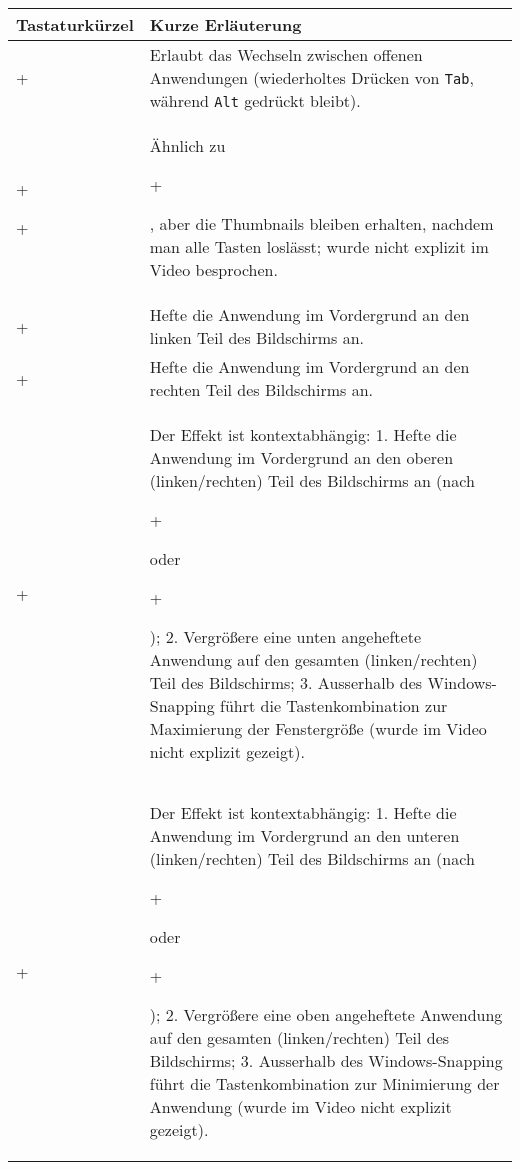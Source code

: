 \documentclass[11pt,a4paper]{scrartcl}
\newcommand*\keystroke[1]{%
  \begin{tikzpicture}[baseline=(key.base), very thin, line cap=round, black, rounded corners=0pt]%
    \node [draw, fill=white, fill opacity=1, rectangle, rounded corners=2pt, inner sep=1pt, minimum width=1.2em, font=\scriptsize\sffamily] (key) {#1\strut};

    \begin{scope}[on background layer]
      \draw [rounded corners=1pt, fill=white] ($ (key.north west) + (-2pt, 2pt) $) rectangle ($ (key.south east) + (2pt, -2pt) $);

      \fill [gray!60] ($ (key.south west) + (2pt, 0.1pt) $) -- ($ (key.south west) + (-1pt, -2pt) $)
                  -- ($ (key.south east) + (1pt, -2pt) $)  -- ($ (key.south east) + (-2pt, 0.1pt) $) -- cycle;

      \fill [gray!60] ($ (key.south east) + (-0.1pt, 2pt) $) -- ($ (key.south east) + (2pt, -1pt) $)
                  -- ($ (key.north east) + (2pt, 1pt) $)    -- ($ (key.north east) + (-0.1pt, -2pt) $) -- cycle;
    \end{scope}

    \draw ($ (key.north west) + (0.1pt, -2pt) $) -- ($ (key.north west) + (-2pt, 1pt) $);
    \draw ($ (key.north west) + (2pt, -0.1pt) $) -- ($ (key.north west) + (-1pt, 2pt) $);

    \draw ($ (key.north east) + (-0.1pt, -2pt) $) -- ($ (key.north east) + (2pt, 1pt) $);
    \draw ($ (key.north east) + (-2pt, -0.1pt) $) -- ($ (key.north east) + (1pt, 2pt) $);

    \draw ($ (key.south west) + (0.1pt, 2pt) $) -- ($ (key.south west) + (-2pt, -1pt) $);
    \draw ($ (key.south west) + (2pt, 0.1pt) $) -- ($ (key.south west) + (-1pt, -2pt) $);

    \draw ($ (key.south east) + (-0.1pt, 2pt) $) -- ($ (key.south east) + (2pt, -1pt) $);
    \draw ($ (key.south east) + (-2pt, 0.1pt) $) -- ($ (key.south east) + (1pt, -2pt) $);
  \end{tikzpicture}%
}
\newcommand{\WindowsLogo}{\raisebox{-0.1em}{%
  \texttt{[image: Windows\_3\_logo\_simplified]}}}
\begin{document}
\begin{center}
  \begin{tabularx}{0.9\textwidth}{lX}
  \toprule
  Tastaturkürzel & Kurze Erläuterung \\
  \midrule
  \keystroke{Alt}+\keystroke{Tab} & Erlaubt das Wechseln zwischen offenen   Anwendungen (wiederholtes Drücken von \texttt{Tab}, während \texttt{Alt} gedrückt bleibt).\\
  \keystroke{Ctrl}+\keystroke{Alt}+\keystroke{Tab} & Ähnlich zu
  \keystroke{Alt}+\keystroke{Tab}, aber die Thumbnails bleiben erhalten,
  nachdem man alle Tasten loslässt; wurde nicht explizit im Video besprochen. \\
  \midrule 
  \keystroke{\WindowsLogo}+\keystroke{$\leftarrow$} & Hefte die Anwendung im Vordergrund an den linken Teil des Bildschirms an. \\
  \keystroke{\WindowsLogo}+\keystroke{$\rightarrow$} & Hefte die Anwendung im Vordergrund an den rechten Teil des Bildschirms an. \\
  \midrule
  \keystroke{\WindowsLogo}+\keystroke{$\uparrow$} & Der Effekt ist
  kontextabhängig: 1. Hefte die Anwendung im Vordergrund an den oberen
  (linken/rechten) Teil des Bildschirms an (nach
  \keystroke{\WindowsLogo}+\keystroke{$\leftarrow$} oder
  \keystroke{\WindowsLogo}+\keystroke{$\rightarrow$}); 2. Vergrößere
  eine unten angeheftete Anwendung auf den gesamten (linken/rechten)
  Teil des Bildschirms; 3. Ausserhalb des Windows-Snapping führt die
  Tastenkombination zur Maximierung der Fenstergröße (wurde im Video
  nicht explizit gezeigt). \\
  \keystroke{\WindowsLogo}+\keystroke{$\downarrow$} & Der Effekt ist
  kontextabhängig: 1. Hefte die Anwendung im Vordergrund an den unteren
  (linken/rechten) Teil des Bildschirms an (nach
  \keystroke{\WindowsLogo}+\keystroke{$\leftarrow$} oder
  \keystroke{\WindowsLogo}+\keystroke{$\rightarrow$}); 2. Vergrößere
  eine oben angeheftete Anwendung auf den gesamten (linken/rechten) Teil
  des Bildschirms; 3. Ausserhalb des Windows-Snapping führt die
  Tastenkombination zur Minimierung der Anwendung (wurde im Video nicht
  explizit gezeigt). \\
  \bottomrule
  \end{tabularx}
\end{center}
%
\end{document}

